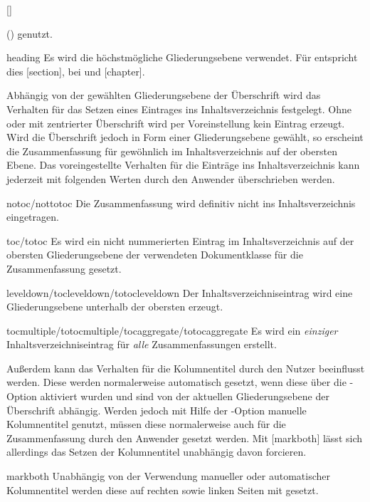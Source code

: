 \begin{Declaration*}{}
\begin{Declaration*}{}
\begin{Declaration*}{}
\begin{Declaration}{[\PSet]}
\begin{values}
  () genutzt. 
\item[heading]
  Es wird die höchstmögliche Gliederungsebene verwendet. Für 
   entspricht dies [section], bei 
   und  [chapter].
\end{values}
%
Abhängig von der gewählten Gliederungsebene der Überschrift wird das Verhalten 
für das Setzen eines Eintrages ins Inhaltsverzeichnis festgelegt. Ohne oder mit 
zentrierter Überschrift wird per Voreinstellung kein Eintrag erzeugt. Wird die 
Überschrift jedoch in Form einer Gliederungsebene gewählt, so erscheint die 
Zusammenfassung für gewöhnlich im Inhaltsverzeichnis auf der obersten Ebene. 
Das voreingestellte Verhalten für die Einträge ins Inhaltsverzeichnis kann 
jederzeit mit folgenden Werten durch den Anwender überschrieben werden.
%
\begin{values}
\item[notoc/nottotoc]
  Die Zusammenfassung wird definitiv nicht ins Inhaltsverzeichnis eingetragen.
\item[toc/totoc]
  Es wird ein nicht nummerierten Eintrag im Inhaltsverzeichnis auf der obersten 
  Gliederungsebene der verwendeten Dokumentklasse für die Zusammenfassung 
  gesetzt.
\item[leveldown/tocleveldown/totocleveldown]
  Der Inhaltsverzeichniseintrag wird eine Gliederungsebene unterhalb der 
  obersten erzeugt.
\item[tocmultiple/totocmultiple/tocaggregate/totocaggregate]
  Es wird ein \emph{einziger} Inhaltsverzeichniseintrag für \emph{alle} 
  Zusammenfassungen erstellt.
\end{values}
%
Außerdem kann das Verhalten für die Kolumnentitel durch den Nutzer beeinflusst 
werden. Diese werden normalerweise automatisch gesetzt, wenn diese über die 
\KOMAScript-Option  aktiviert wurden und sind von der 
aktuellen Gliederungsebene der Überschrift abhängig. Werden jedoch mit Hilfe 
der \KOMAScript-Option  manuelle Kolumnentitel genutzt, 
müssen diese normalerweise auch für die Zusammenfassung durch den Anwender 
gesetzt werden. Mit [markboth] lässt sich allerdings das 
Setzen der Kolumnentitel unabhängig davon forcieren.
%
\begin{values}
\item[markboth]
  Unabhängig von der Verwendung manueller oder automatischer Kolumnentitel 
  werden diese auf rechten sowie linken Seiten mit  gesetzt.

\end{values}
\end{Declaration}
\end{Declaration*}
\end{Declaration*}
\end{Declaration*}

